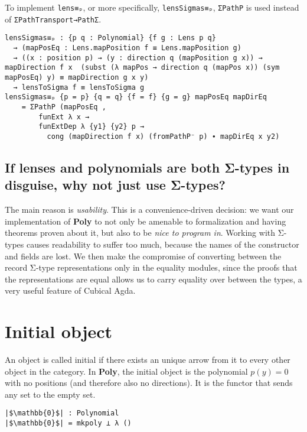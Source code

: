 To implement \texttt{lens≡ₚ}, or more specifically, \texttt{lensSigmas≡ₚ}, \texttt{ΣPathP} is used instead of \texttt{ΣPathTransport→PathΣ}.

\begin{verbatim}
lensSigmas≡ₚ : {p q : Polynomial} {f g : Lens p q}
  → (mapPosEq : Lens.mapPosition f ≡ Lens.mapPosition g)
  → ((x : position p) → (y : direction q (mapPosition g x)) → mapDirection f x  (subst (λ mapPos → direction q (mapPos x)) (sym mapPosEq) y) ≡ mapDirection g x y)
  → lensToSigma f ≡ lensToSigma g
lensSigmas≡ₚ {p = p} {q = q} {f = f} {g = g} mapPosEq mapDirEq
    = ΣPathP (mapPosEq , 
        funExt λ x →
        funExtDep λ {y1} {y2} p →
          cong (mapDirection f x) (fromPathP⁻ p) ∙ mapDirEq x y2)
\end{verbatim}

\subsection*{If lenses and polynomials are both Σ-types in disguise, why not just use Σ-types?}

The main reason is \textit{usability}. This is a convenience-driven decision: we want our implementation of \textbf{Poly} to not only be amenable to formalization and having theorems proven about it, but also to be \textit{nice to program in}. Working with Σ-types causes readability to suffer too much, because the names of the constructor and fields are lost. We then make the compromise of converting between the record Σ-type representations only in the equality modules, since the proofs that the representations are equal allows us to carry equality over between the types, a very useful feature of Cubical Agda.



\section{Initial object}
An object is called initial if there exists an unique arrow from it to every other object in the category. In \textbf{Poly}, the initial object is the polynomial $p(y) = 0$ with no positions (and therefore also no directions). It is the functor that sends any set to the empty set.

\begin{verbatim}
|$\mathbb{0}$| : Polynomial
|$\mathbb{0}$| = mkpoly ⊥ λ ()
\end{verbatim}

